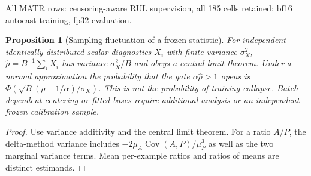 \documentclass{article}
\newtheorem{proposition}{Proposition}
\begin{document}
\begin{table}[t]
\centering
\caption{Historical battery results with evaluation-selected checkpoints, retained as exploratory comparisons. The legacy RUL score combines errors against observed lifetimes and censored lower bounds. Reference rows use four seeds; other rows use ten. SOH and legacy RUL are separate outcomes; single-task rows provide references.}
\label{tab:bmtl}
\footnotesize
{}
\vspace{1pt}
{\footnotesize All MATR rows: censoring-aware RUL supervision, all 185 cells retained; bf16 autocast training, fp32 evaluation.}
\end{table}

\begin{proposition}[Sampling fluctuation of a frozen statistic]\label{prop:finitebatch}
For independent identically distributed scalar diagnostics $X_i$ with finite variance $\sigma_X^2$, $\hat\rho=B^{-1}\sum_iX_i$ has variance $\sigma_X^2/B$ and obeys a central limit theorem. Under a normal approximation the probability that the \emph{gate} $\alpha\hat\rho>1$ opens is $\Phi(\sqrt B(\rho-1/\alpha)/\sigma_X)$. This is not the probability of training collapse. Batch-dependent centering or fitted bases require additional analysis or an independent frozen calibration sample.
\end{proposition}
\begin{proof}
Use variance additivity and the central limit theorem. For a ratio $A/P$, the delta-method variance includes $-2\mu_A\operatorname{Cov}(A,P)/\mu_P^3$ as well as the two marginal variance terms. Mean per-example ratios and ratios of means are distinct estimands.
\end{proof}
\end{document}
